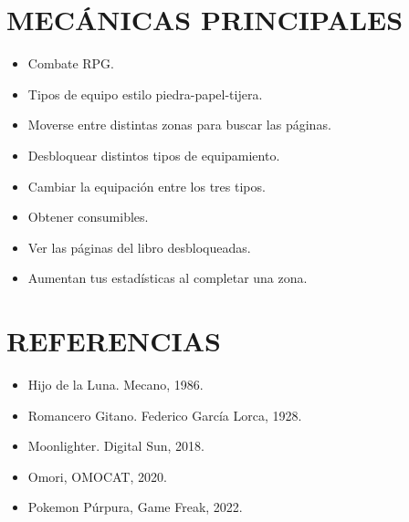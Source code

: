 \documentclass{article}
\begin{document}
    \section{MECÁNICAS PRINCIPALES}
    \begin{itemize}
        \item Combate RPG.
        \item Tipos de equipo estilo piedra-papel-tijera.
        \item Moverse entre distintas zonas para buscar las páginas.
        \item Desbloquear distintos tipos de equipamiento.
        \item Cambiar la equipación entre los tres tipos.
        \item Obtener consumibles.
        \item Ver las páginas del libro desbloqueadas.
        \item Aumentan tus estadísticas al completar una zona.
    \end{itemize}

    \section{REFERENCIAS}
    \begin{itemize}
        \item Hijo de la Luna. Mecano, 1986.
        \item Romancero Gitano. Federico García Lorca, 1928.
        \item Moonlighter. Digital Sun, 2018.
        \item Omori, OMOCAT, 2020.
        \item Pokemon Púrpura, Game Freak, 2022. 
    \end{itemize}
\end{document}
